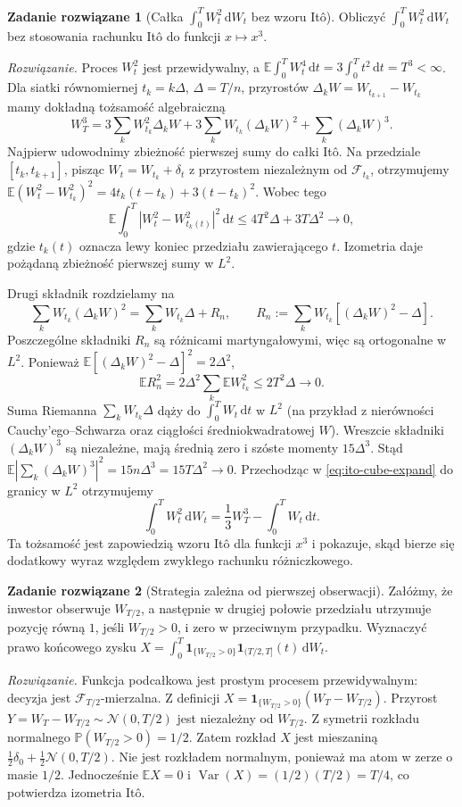 \documentclass[11pt,a4paper,oneside]{report}
\numberwithin{equation}{chapter}
\theoremstyle{plain}
\theoremstyle{definition}
\newtheorem{zadanie}{Zadanie rozwiązane}[chapter]
\theoremstyle{remark}
\newcommand{\Prob}{\mathbb{P}}
\newcommand{\E}{\mathbb{E}}
\newcommand{\Var}{\operatorname{Var}}
\newcommand{\calF}{\mathcal{F}}
\newcommand{\ind}[1]{\mathbf{1}_{#1}}
\newcommand{\dd}{\mathrm{d}}
\newcommand{\Normal}{\mathcal{N}}
\begin{document}
\begin{zadanie}[Całka $\int_0^T W_t^2\,\dd W_t$ bez wzoru Itô]
Obliczyć $\int_0^T W_t^2\,\dd W_t$ bez stosowania
rachunku Itô do funkcji $x\mapsto x^3$.

\emph{Rozwiązanie.} Proces $W_t^2$ jest przewidywalny,
a $\E\int_0^T W_t^4\,\dd t
=3\int_0^T t^2\,\dd t=T^3<\infty$.
Dla siatki równomiernej $t_k=k\Delta$, $\Delta=T/n$,
przyrostów $\Delta_kW=W_{t_{k+1}}-W_{t_k}$ mamy
dokładną tożsamość algebraiczną
\[
W_T^3
=3\sum_kW_{t_k}^2\Delta_kW
+3\sum_kW_{t_k}(\Delta_kW)^2
+\sum_k(\Delta_kW)^3.
\tag{2.14}\label{eq:ito-cube-expand}
\]
Najpierw udowodnimy zbieżność pierwszej sumy do całki Itô.
Na przedziale $[t_k,t_{k+1}]$, pisząc
$W_t=W_{t_k}+\delta_t$ z przyrostem niezależnym od
$\calF_{t_k}$, otrzymujemy
$\E(W_t^2-W_{t_k}^2)^2
=4t_k(t-t_k)+3(t-t_k)^2$.
Wobec tego
\[
\E\int_0^T|W_t^2-W_{t_k(t)}^2|^2\,\dd t
\le 4T^2\Delta+3T\Delta^2\longrightarrow0,
\]
gdzie $t_k(t)$ oznacza lewy koniec przedziału
zawierającego $t$. Izometria daje pożądaną zbieżność
pierwszej sumy w $L^2$.

Drugi składnik rozdzielamy na
\[
\sum_kW_{t_k}(\Delta_kW)^2
=\sum_kW_{t_k}\Delta+R_n,\qquad
R_n:=\sum_kW_{t_k}[(\Delta_kW)^2-\Delta].
\]
Poszczególne składniki $R_n$ są różnicami
martyngałowymi, więc są ortogonalne w $L^2$. Ponieważ
$\E[(\Delta_kW)^2-\Delta]^2=2\Delta^2$,
\[
\E R_n^2
=2\Delta^2\sum_k\E W_{t_k}^2
\le2T^2\Delta\longrightarrow0.
\]
Suma Riemanna $\sum_kW_{t_k}\Delta$ dąży do
$\int_0^TW_t\,\dd t$ w $L^2$ (na przykład
z nierówności Cauchy'ego--Schwarza oraz ciągłości
średniokwadratowej $W$). Wreszcie składniki
$(\Delta_kW)^3$ są niezależne, mają średnią zero
i szóste momenty $15\Delta^3$. Stąd
$\E|\sum_k(\Delta_kW)^3|^2=15n\Delta^3=15T\Delta^2\to0$.
Przechodząc w \eqref{eq:ito-cube-expand} do granicy w $L^2$
otrzymujemy
\[
\int_0^TW_t^2\,\dd W_t
=\frac13W_T^3-\int_0^TW_t\,\dd t.
\tag{2.15}\label{eq:W2-dW}
\]
Ta tożsamość jest zapowiedzią wzoru Itô dla
funkcji $x^3$ i pokazuje, skąd bierze się dodatkowy
wyraz względem zwykłego rachunku różniczkowego.
\end{zadanie}

\begin{zadanie}[Strategia zależna od pierwszej obserwacji]
Załóżmy, że inwestor obserwuje $W_{T/2}$, a następnie
w drugiej połowie przedziału utrzymuje pozycję równą
$1$, jeśli $W_{T/2}>0$, i zero w przeciwnym przypadku.
Wyznaczyć prawo końcowego zysku
$X=\int_0^T\ind{\{W_{T/2}>0\}}\ind{(T/2,T]}(t)\,\dd W_t$.

\emph{Rozwiązanie.} Funkcja podcałkowa jest prostym
procesem przewidywalnym: decyzja jest
$\calF_{T/2}$-mierzalna. Z definicji
$X=\ind{\{W_{T/2}>0\}}(W_T-W_{T/2})$.
Przyrost $Y=W_T-W_{T/2}\sim\Normal(0,T/2)$ jest
niezależny od $W_{T/2}$. Z symetrii rozkładu normalnego
$\Prob(W_{T/2}>0)=1/2$. Zatem rozkład $X$ jest mieszaniną
$\frac12\delta_0+\frac12\Normal(0,T/2)$.
Nie jest rozkładem normalnym, ponieważ ma atom
w zerze o masie $1/2$. Jednocześnie
$\E X=0$ i $\Var(X)=(1/2)(T/2)=T/4$,
co potwierdza izometria Itô.
\end{zadanie}
\end{document}
